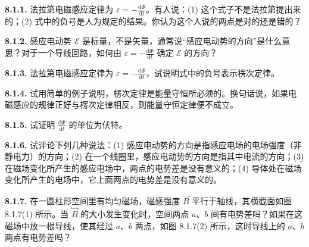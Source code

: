 \textbf{8.1.1.} 法拉第电磁感应定律为 $\displaystyle \varepsilon = -\frac{\mathrm{d}\Phi}{\mathrm{d}t}$。有人说：(1) 这个式子不是法拉第提出来的；(2) 式中的负号是人为规定的结果。你认为这个人说的两点是对的还是错的？

\vfill
\newpage

\textbf{8.1.2.} 感应电动势 $\mathcal{E}$ 是标量，不是矢量，通常说“感应电动势的方向”是什么意思？对于一个导线回路，如何由 $\displaystyle \varepsilon = -\frac{\mathrm{d}\Phi}{\mathrm{d}t}$ 确定 $\mathcal{E}$ 的方向？

\vfill
\newpage

\textbf{8.1.3.} 法拉第电磁感应定律为 $\displaystyle \varepsilon = -\frac{\mathrm{d}\Phi}{\mathrm{d}t}$，试说明式中的负号表示楞次定律。

\vfill
\newpage

\textbf{8.1.4.} 试用简单的例子说明，楞次定律是能量守恒所必须的。换句话说，如果电磁感应的规律正好与楞次定律相反，则能量守恒定律便不成立。

\vfill
\newpage

\textbf{8.1.5.} 试证明 $\displaystyle \frac{\mathrm{d}\Phi}{\mathrm{d}t}$ 的单位为伏特。

\vfill
\newpage

\textbf{8.1.6.} 试评论下列几种说法：(1) 感应电动势的方向是指感应电场的电场强度（非静电力）的方向；(2) 在一个线圈里，感应电动势的方向是指其中电流的方向；(3) 在磁场变化所产生的感应电场中，两点的电势差是没有意义的；(4) 导体处在磁场变化所产生的电场中，它上面两点的电势差是没有意义的。

\vfill
\newpage

\textbf{8.1.7.} 在一圆柱形空间里有均匀磁场，磁感强度 $\vec{B}$ 平行于轴线，其横截面如图 8.1.7(1) 所示。当 $\vec{B}$ 的大小发生变化时，空间两点 $a$、$b$ 间有电势差吗？如果在这磁场中放一根导线，使其经过 $a$、$b$ 两点，如图 8.1.7(2) 所示，这时导线上的 $a$、$b$ 两点有电势差吗？

\begin{center}
  \begin{minipage}[b]{0.47\linewidth}
    \centering
  \end{minipage}\hfill
  \begin{minipage}[b]{0.47\linewidth}
    \centering
  \end{minipage}
\end{center}

\vfill
\newpage

